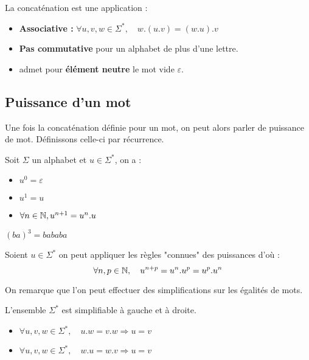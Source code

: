 \begin{proposition}
    La concaténation est une application :
    \begin{itemize}
        \item \textbf{Associative : } $\forall u,v,w \in \Sigma^*, \quad w.(u.v) = (w.u).v$ 
        \item \textbf{Pas commutative} pour un alphabet de plus d'une lettre. 
        \item admet pour \textbf{élément neutre} le mot vide $\varepsilon$. 
    \end{itemize}
\end{proposition}

\subsection{Puissance d'un mot}

Une fois la concaténation définie pour un mot, on peut alors parler de puissance de mot. 
Définissons celle-ci par récurrence. 

\begin{definition}
    Soit $\Sigma$ un alphabet et $ u \in \Sigma^*$, on a :
    \begin{itemize}
        \item $u^0 = \varepsilon $
        \item $u^1 = u$ 
        \item $ \forall n \in \mathbb{N}, u^{n+1} = u^n.u$ 
    \end{itemize}
\end{definition}

\begin{example}
    $(ba)^3 = bababa $
\end{example}

\begin{proposition}
    Soient $u \in \Sigma^*$ on peut appliquer les règles "connues" des puissances d'où : $$ \forall n,p \in \mathbb{N}, \quad  u^{n+p} = u^n . u^p = u^p . u^n $$ 
\end{proposition}

On remarque que l'on peut effectuer des simplifications sur les égalités de mots. 

\begin{prop}[Simplifications]
    L'ensemble $\Sigma^*$ est simplifiable à gauche et à droite. 
    \begin{itemize}
        \item $\forall u,v,w \in \Sigma^*, \quad u.w = v.w \Longrightarrow u = v $
        \item $\forall u,v,w \in \Sigma^*, \quad w.u = w.v \Longrightarrow u = v $
    \end{itemize}
\end{prop}

